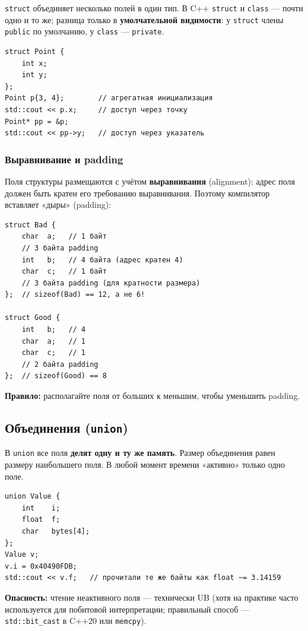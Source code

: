 \texttt{struct} объединяет несколько полей в один тип. В C++ \texttt{struct} и
\texttt{class} --- почти одно и то же; разница только в \textbf{умолчательной
видимости}: у \texttt{struct} члены \texttt{public} по умолчанию, у
\texttt{class} --- \texttt{private}.

\begin{lstlisting}
struct Point {
    int x;
    int y;
};
Point p{3, 4};        // агрегатная инициализация
std::cout << p.x;     // доступ через точку
Point* pp = &p;
std::cout << pp->y;   // доступ через указатель
\end{lstlisting}

\subsubsection{Выравнивание и padding}

Поля структуры размещаются с учётом \textbf{выравнивания} (alignment): адрес поля
должен быть кратен его требованию выравнивания. Поэтому компилятор вставляет
«дыры» (padding):

\begin{lstlisting}
struct Bad {
    char  a;   // 1 байт
    // 3 байта padding
    int   b;   // 4 байта (адрес кратен 4)
    char  c;   // 1 байт
    // 3 байта padding (для кратности размера)
};  // sizeof(Bad) == 12, а не 6!

struct Good {
    int   b;   // 4
    char  a;   // 1
    char  c;   // 1
    // 2 байта padding
};  // sizeof(Good) == 8
\end{lstlisting}

\textbf{Правило:} располагайте поля от больших к меньшим, чтобы уменьшить padding.

\subsection{Объединения (\texttt{union})}

В \texttt{union} все поля \textbf{делят одну и ту же память}. Размер объединения
равен размеру наибольшего поля. В любой момент времени «активно» только одно
поле.

\begin{lstlisting}
union Value {
    int    i;
    float  f;
    char   bytes[4];
};
Value v;
v.i = 0x40490FDB;
std::cout << v.f;   // прочитали те же байты как float ~= 3.14159
\end{lstlisting}

\textbf{Опасность:} чтение неактивного поля --- технически UB (хотя на практике
часто используется для побитовой интерпретации; правильный способ ---
\texttt{std::bit\_cast} в C++20 или \texttt{memcpy}).


